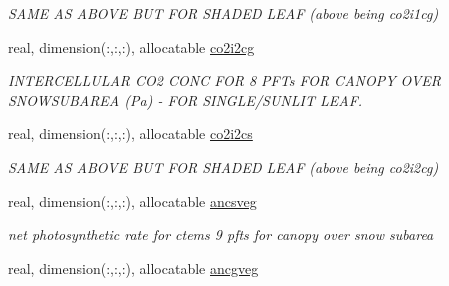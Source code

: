\begin{DoxyCompactItemize}
\begin{DoxyCompactList}\small\item\em S\+A\+M\+E A\+S A\+B\+O\+V\+E B\+U\+T F\+O\+R S\+H\+A\+D\+E\+D L\+E\+A\+F (above being co2i1cg) \end{DoxyCompactList}\item 
\hypertarget{structctem__statevars_1_1veg__rot_a4b6f19dd6b70f105db8e2867e12fda22}{}real, dimension(\+:,\+:,\+:), allocatable \hyperlink{structctem__statevars_1_1veg__rot_a4b6f19dd6b70f105db8e2867e12fda22}{co2i2cg}\label{structctem__statevars_1_1veg__rot_a4b6f19dd6b70f105db8e2867e12fda22}

\begin{DoxyCompactList}\small\item\em I\+N\+T\+E\+R\+C\+E\+L\+L\+U\+L\+A\+R C\+O2 C\+O\+N\+C F\+O\+R 8 P\+F\+Ts F\+O\+R C\+A\+N\+O\+P\+Y O\+V\+E\+R S\+N\+O\+W\+S\+U\+B\+A\+R\+E\+A (Pa) -\/ F\+O\+R S\+I\+N\+G\+L\+E/\+S\+U\+N\+L\+I\+T L\+E\+A\+F. \end{DoxyCompactList}\item 
\hypertarget{structctem__statevars_1_1veg__rot_a8c4502cff8fcc79be779615b288ce181}{}real, dimension(\+:,\+:,\+:), allocatable \hyperlink{structctem__statevars_1_1veg__rot_a8c4502cff8fcc79be779615b288ce181}{co2i2cs}\label{structctem__statevars_1_1veg__rot_a8c4502cff8fcc79be779615b288ce181}

\begin{DoxyCompactList}\small\item\em S\+A\+M\+E A\+S A\+B\+O\+V\+E B\+U\+T F\+O\+R S\+H\+A\+D\+E\+D L\+E\+A\+F (above being co2i2cg) \end{DoxyCompactList}\item 
\hypertarget{structctem__statevars_1_1veg__rot_a7c409efb5a92317f96d7eb4163656edc}{}real, dimension(\+:,\+:,\+:), allocatable \hyperlink{structctem__statevars_1_1veg__rot_a7c409efb5a92317f96d7eb4163656edc}{ancsveg}\label{structctem__statevars_1_1veg__rot_a7c409efb5a92317f96d7eb4163656edc}

\begin{DoxyCompactList}\small\item\em net photosynthetic rate for ctems 9 pfts for canopy over snow subarea \end{DoxyCompactList}\item 
\hypertarget{structctem__statevars_1_1veg__rot_ac650e4cdd83740ac7ff27189ad342013}{}real, dimension(\+:,\+:,\+:), allocatable \hyperlink{structctem__statevars_1_1veg__rot_ac650e4cdd83740ac7ff27189ad342013}{ancgveg}\label{structctem__statevars_1_1veg__rot_ac650e4cdd83740ac7ff27189ad342013}


\end{DoxyCompactItemize}
